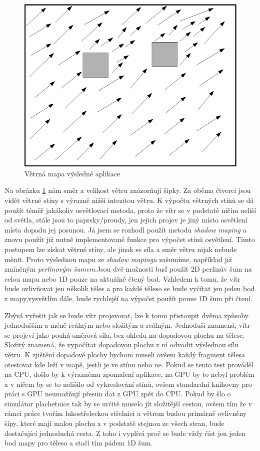 \begin{figure}
	\begin{center}
		\includegraphics[scale=0.5]{obrazky-figures/windMap}
		\caption{Větrná mapa výsledné aplikace}\label{windmap}
\end{center}\end{figure}
Na obrázku \ref{windmap} nám směr a velikost větru znázorňují šipky. Za oběma čtverci jsou vidět větrné stíny s výrazně nižší intezitou větru. K výpočtu větrných stínů se dá použít téměř jakákoliv osvětlovací metoda, proto že vítr se v podstatě ničím neliší od světla, stále jsou to paprsky/proudy, jen jejich projev je jiný místo osvětlení místa dopadu jej posunou. Já jsem se rozhodl použít metodu \emph{shadow maping} a znovu použít již nutně implementované funkce pro výpočet stínů osvětlení. Tímto postupem lze získat větrné stíny, ale jinak se síla a směr větru nijak nebude měnit. Proto výslednou mapu ze \emph{shadow mapingu} zašumíme, například již zmíněným \emph{perlinovým šumem}.Jsou dvě možnosti buď použít 2D perlinův šum na celou mapu nebo 1D pouze na aktuálně čtený bod. Vzhledem k tomu, že vítr bude ovlivňovat jen několik těles a pro každé těleso se bude vyčítat jen jeden bod z mapy,vysvětlím dále, bude rychlejší na výpočet použít pouze 1D šum při čtení.

Zbývá vyřešit jak se bude vítr projevovat, lze k tomu  přistoupit dvěma způsoby jednodušším a méně reálným nebo  složitým a reálným. Jednoduší znamená, vítr se projeví jako pouhá směrová síla, bez ohledu na dopadovou plochu na tělese. Složitý znamená, že vypočítat dopadovou plochu z ní odvodit výslednou sílu větru. K zjištění dopadové plochy bychom museli ovšem každý fragment tělesa otestovat kde leží v mapě, jestli je ve stínu nebo ne. Pokud se tento test prováděl na CPU, došlo by k výraznému zpomalení aplikace, na GPU by to nebyl problém a v ničem by se to nelišilo od vykreslování stínů, ovšem standardní knihovny pro práci s GPU neumožňují přesun dat z GPU zpět do CPU. Pokud by šlo o simulátor plachetnice tak by se určitě muselo jít složitější cestou, ovšem tím že v rámci práce tvořím lukostřeleckou střelnici a větrem budou primárně ovlivněny šípy, které mají malou plochu a v podstatě stejnou ze všech stran, bude dostačující jednoduchá cesta. Z toho i vyplívá proč se bude vždy číst jen jeden bod mapy pro těleso a stačí tím pádem 1D šum.   

